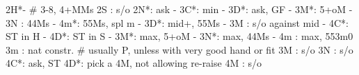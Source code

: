 2H*- # 3-8, 4+MMs
2S : s/o
2N*: ask
   - 3C*: min
		- 3D*: ask, GF
			 - 3M*: 5+oM
			 - 3N : 44Ms
			 - 4m*: 55Ms, spl m
   - 3D*: mid+, 55Ms
		- 3M : s/o against mid
		- 4C*: ST in H
		- 4D*: ST in S
   - 3M*: max, 5+oM
   - 3N*: max, 44Ms
   - 4m : max, 553m0
3m : nat constr.  # usually P, unless with very good hand or fit
3M : s/o
3N : s/o
4C*: ask, ST
4D*: pick a 4M, not allowing re-raise
4M : s/o
